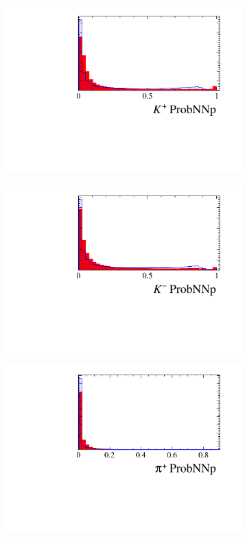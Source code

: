 \begin{figure}[!h]
\begin{subfigure}[t]{0.22\textwidth}
      \includegraphics[width=1.0\textwidth]{figs/Selection/Ds_BDT_Var_Ds2KKPi_D_K0_MC15TuneV1_ProbNNp.pdf}
   \end{subfigure}
   \begin{subfigure}[t]{0.22\textwidth}
      \centering
      \includegraphics[width=1.0\textwidth]{figs/Selection/Ds_BDT_Var_Ds2KKPi_D_K1_MC15TuneV1_ProbNNp.pdf}
   \end{subfigure}
   \begin{subfigure}[t]{0.22\textwidth}
      \centering
      \includegraphics[width=1.0\textwidth]{figs/Selection/Ds_BDT_Var_Ds2KKPi_D_P_MC15TuneV1_ProbNNp.pdf}

\end{subfigure}
\end{figure}
